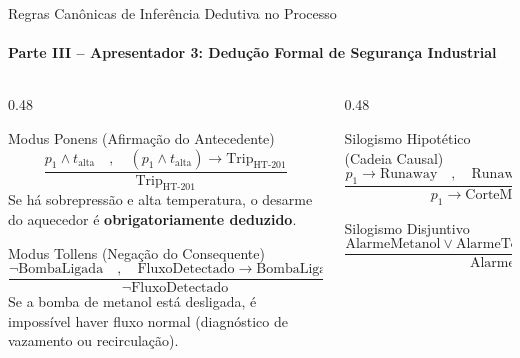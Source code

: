 \documentclass[aspectratio=169, 10pt]{beamer}
\begin{document}
\begin{frame}{Regras Canônicas de Inferência Dedutiva no Processo}
  \framesubtitle{Parte III -- Apresentador 3: Dedução Formal de Segurança Industrial}
  \begin{columns}[t]
    \begin{column}{0.48\textwidth}
      \begin{block}{Modus Ponens (Afirmação do Antecedente)}
        $$\frac{p_1 \land t_{\text{alta}} \quad,\quad (p_1 \land t_{\text{alta}}) \to \text{Trip}_{\text{HT-201}}}{\text{Trip}_{\text{HT-201}}}$$
        Se há sobrepressão e alta temperatura, o desarme do aquecedor é \textbf{obrigatoriamente deduzido}.
      \end{block}
      \vspace{0.2cm}
      \begin{block}{Modus Tollens (Negação do Consequente)}
        $$\frac{\neg \text{BombaLigada} \quad,\quad \text{FluxoDetectado} \to \text{BombaLigada}}{\neg \text{FluxoDetectado}}$$
        Se a bomba de metanol está desligada, é impossível haver fluxo normal (diagnóstico de vazamento ou recirculação).
      \end{block}
    \end{column}

    \begin{column}{0.48\textwidth}
      \begin{block}{Silogismo Hipotético (Cadeia Causal)}
        $$\frac{p_1 \to \text{Runaway} \quad,\quad \text{Runaway} \to \text{CorteMetóxido}}{p_1 \to \text{CorteMetóxido}}$$
      \end{block}
      \vspace{0.2cm}
      \begin{block}{Silogismo Disjuntivo}
        $$\frac{\text{AlarmeMetanol} \lor \text{AlarmeTemperatura} \quad,\quad \neg \text{AlarmeMetanol}}{\text{AlarmeTemperatura}}$$
      \end{block}
    \end{column}
  \end{columns}
\end{frame}
\end{document}
